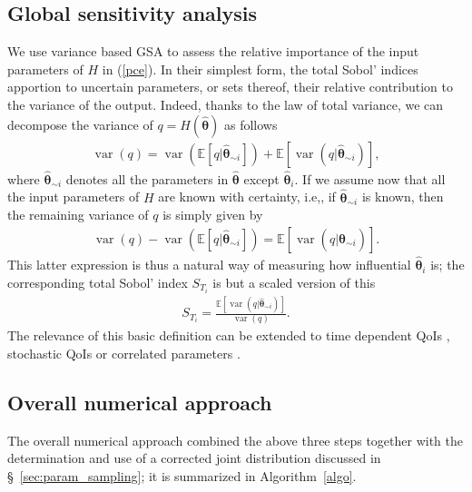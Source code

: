 \subsection{Global sensitivity analysis} 
We use variance based GSA to assess the relative importance of the input parameters of $H$ in (\ref{pce}). In their simplest form,  the total Sobol' indices \cite{saltellitotalindex} apportion to uncertain parameters, or sets thereof, their relative contribution to the variance of the output. Indeed, thanks to the law of total variance, we can decompose the variance of $q = H(\hat{\boldsymbol{\theta}})$ as follows
\begin{eqnarray}
\operatorname{var}(q) = \operatorname{var}(\mathbb E[q|\hat{\boldsymbol{\theta}}_{\sim i}]) + \mathbb E[\operatorname{var}(q|\hat{\boldsymbol{\theta}}_{\sim i})], \label{ltv}
\end{eqnarray}
where $\hat{\boldsymbol{\theta}}_{\sim i}$ denotes all the parameters in $\hat{\boldsymbol{\theta}}$ except $\hat{\boldsymbol{\theta}}_i$. If we assume now that all the input parameters of $H$ are known with certainty, i.e,, if $\hat{\boldsymbol{\theta}}_{\sim i}$ is known, then the remaining variance of $q$ is simply given by 
\begin{eqnarray*}
\operatorname{var}(q) - \operatorname{var}(\mathbb E[q|\hat{\boldsymbol{\theta}}_{\sim i}]) = \mathbb E[\operatorname{var}(q|\hat{\boldsymbol{\theta}}_{\sim i})]. 
\end{eqnarray*}
This latter expression is thus a natural way of measuring how influential $\hat{\boldsymbol{\theta}}_i$ is; the corresponding total Sobol' index $S_{T_i}$ is but a scaled version of this
\begin{eqnarray}
S_{T_i} = \frac{\mathbb E[\operatorname{var}(q|\hat{\boldsymbol{\theta}}_{\sim i})]}{\operatorname{var}(q) }. \label{sobol}
\end{eqnarray}
The relevance of this basic definition can be extended to time dependent QoIs \cite{timegsa}, stochastic QoIs \cite{stogsa} or correlated parameters \cite{corvar}.


\subsection{Overall numerical approach}
The overall numerical approach combined the above three steps together with the determination and use of a corrected joint distribution discussed in \S~\ref{sec:param_sampling}; it is summarized in  Algorithm~\ref{algo}. 

